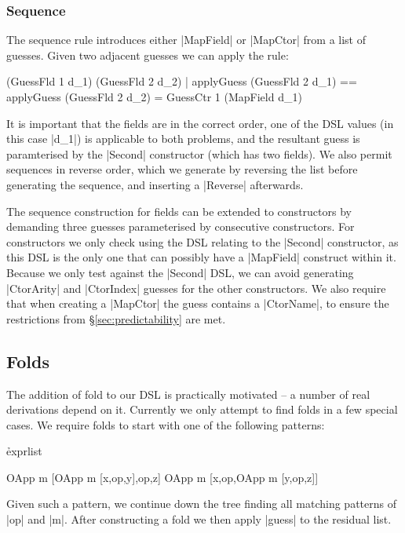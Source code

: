 \documentclass[preprint,draft]{sigplanconf}
\begin{document}
\subsubsection{Sequence}
\label{sec:guess_lists_sequence}

The sequence rule introduces either |MapField| or |MapCtor| from a list of guesses. Given two adjacent guesses we can apply the rule:

\ignore\begin{code}
(GuessFld 1 d_1) (GuessFld 2 d_2)
    | applyGuess (GuessFld 2 d_1) == applyGuess (GuessFld 2 d_2)
    = GuessCtr 1 (MapField d_1)
\end{code}

It is important that the fields are in the correct order, one of the DSL values (in this case |d_1|) is applicable to both problems, and the resultant guess is paramterised by the |Second| constructor (which has two fields). We also permit sequences in reverse order, which we generate by reversing the list before generating the sequence, and inserting a |Reverse| afterwards.

The sequence construction for fields can be extended to constructors by demanding three guesses parameterised by consecutive constructors. For constructors we only check using the DSL relating to the |Second| constructor, as this DSL is the only one that can possibly have a |MapField| construct within it. Because we only test against the |Second| DSL, we can avoid generating |CtorArity| and |CtorIndex| guesses for the other constructors. We also require that when creating a |MapCtor| the guess contains a |CtorName|, to ensure the restrictions from \S\ref{sec:predictability} are met.

\subsection{Folds}

The addition of fold to our DSL is practically motivated -- a number of real derivations depend on it. Currently we only attempt to find folds in a few special cases. We require folds to start with one of the following patterns:

\h{exprlist}\begin{code}
OApp m [OApp m [x,op,y],op,z]
OApp m [x,op,OApp m [y,op,z]]
\end{code}

Given such a pattern, we continue down the tree finding all matching patterns of |op| and |m|. After constructing a fold we then apply |guess| to the residual list.
\end{document}
